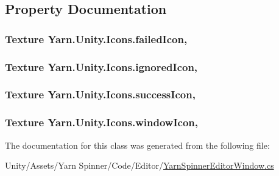 \subsection{Property Documentation}
\hypertarget{a00042_aae7cc0e5016db04a90b2aa0e80957626}{
\subsubsection[{failed\-Icon}]{\setlength{\rightskip}{0pt plus 5cm}Texture Yarn.\-Unity.\-Icons.\-failed\-Icon\hspace{0.3cm}{\ttfamily [static]}, {\ttfamily [get]}}}\label{a00042_aae7cc0e5016db04a90b2aa0e80957626}
\hypertarget{a00042_a3f03f2f0fa137e349853d755e79f2e4a}{
\subsubsection[{ignored\-Icon}]{\setlength{\rightskip}{0pt plus 5cm}Texture Yarn.\-Unity.\-Icons.\-ignored\-Icon\hspace{0.3cm}{\ttfamily [static]}, {\ttfamily [get]}}}\label{a00042_a3f03f2f0fa137e349853d755e79f2e4a}
\hypertarget{a00042_aec8aea03eb6e31771ebc98e0611fff79}{
\subsubsection[{success\-Icon}]{\setlength{\rightskip}{0pt plus 5cm}Texture Yarn.\-Unity.\-Icons.\-success\-Icon\hspace{0.3cm}{\ttfamily [static]}, {\ttfamily [get]}}}\label{a00042_aec8aea03eb6e31771ebc98e0611fff79}
\hypertarget{a00042_aa78ab016ad041bc36850c8b20ba63972}{
\subsubsection[{window\-Icon}]{\setlength{\rightskip}{0pt plus 5cm}Texture Yarn.\-Unity.\-Icons.\-window\-Icon\hspace{0.3cm}{\ttfamily [static]}, {\ttfamily [get]}}}\label{a00042_aa78ab016ad041bc36850c8b20ba63972}


The documentation for this class was generated from the following file\-:\begin{DoxyCompactItemize}
\item 
Unity/\-Assets/\-Yarn Spinner/\-Code/\-Editor/\hyperlink{a00106}{Yarn\-Spinner\-Editor\-Window.\-cs}\end{DoxyCompactItemize}
